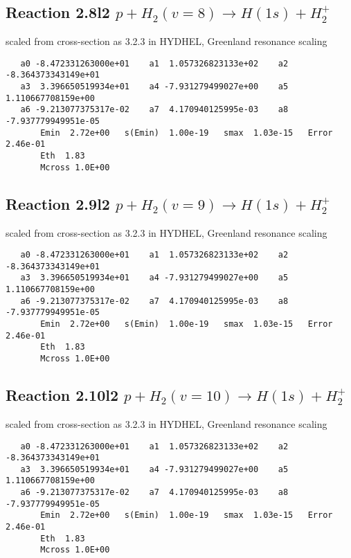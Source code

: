\documentclass[12pt,dvipdfmx]{article}
\begin{document}
\subsection{
Reaction 2.8l2 $   p + H_2(v=8) \rightarrow H(1s) + H_2^+$}

scaled from cross-section as 3.2.3 in HYDHEL, Greenland resonance scaling

\begin{small}\begin{verbatim}
   a0 -8.472331263000e+01    a1  1.057326823133e+02    a2 -8.364373343149e+01
   a3  3.396650519934e+01    a4 -7.931279499027e+00    a5  1.110667708159e+00
   a6 -9.213077375317e-02    a7  4.170940125995e-03    a8 -7.937779949951e-05
       Emin  2.72e+00   s(Emin)  1.00e-19   smax  1.03e-15   Error  2.46e-01
       Eth  1.83
       Mcross 1.0E+00
\end{verbatim}\end{small}

\subsection{
Reaction 2.9l2 $   p + H_2(v=9) \rightarrow H(1s) + H_2^+$}

scaled from cross-section as 3.2.3 in HYDHEL, Greenland resonance scaling

\begin{small}\begin{verbatim}
   a0 -8.472331263000e+01    a1  1.057326823133e+02    a2 -8.364373343149e+01
   a3  3.396650519934e+01    a4 -7.931279499027e+00    a5  1.110667708159e+00
   a6 -9.213077375317e-02    a7  4.170940125995e-03    a8 -7.937779949951e-05
       Emin  2.72e+00   s(Emin)  1.00e-19   smax  1.03e-15   Error  2.46e-01
       Eth  1.83
       Mcross 1.0E+00
\end{verbatim}\end{small}

\subsection{
Reaction 2.10l2 $   p + H_2(v=10) \rightarrow H(1s) + H_2^+$}

scaled from cross-section as 3.2.3 in HYDHEL, Greenland resonance scaling

\begin{small}\begin{verbatim}
   a0 -8.472331263000e+01    a1  1.057326823133e+02    a2 -8.364373343149e+01
   a3  3.396650519934e+01    a4 -7.931279499027e+00    a5  1.110667708159e+00
   a6 -9.213077375317e-02    a7  4.170940125995e-03    a8 -7.937779949951e-05
       Emin  2.72e+00   s(Emin)  1.00e-19   smax  1.03e-15   Error  2.46e-01
       Eth  1.83
       Mcross 1.0E+00
\end{verbatim}\end{small}
\end{document}
